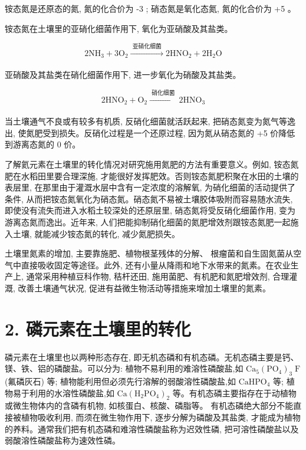 \documentclass[10pt]{article}
\begin{document}
铵态氮是还原态的氮, 氮的化合价为 -3 ; 硝态氮是氧化态氮, 氮的化合价为 +5 。

铵态氮在土壤里的亚硝化细菌作用下, 氧化为亚硝酸及其盐类。

\[
2{\mathrm{{NH}}}_{3} + 3{\mathrm{O}}_{2}\xrightarrow[]{\text{ 亚硝化细菌 }}2{\mathrm{{HNO}}}_{2} + 2{\mathrm{H}}_{2}\mathrm{O}
\]

亚硝酸及其盐类在硝化细菌作用下, 进一步氧化为硝酸及其盐类。

\[
2{\mathrm{{HNO}}}_{2} + {\mathrm{O}}_{2}\xrightarrow[]{\text{ 硝化细菌 }}2{\mathrm{{HNO}}}_{3}
\]

当土壤通气不良或有较多有机质, 反硝化细菌就活跃起来, 把硝态氮变为氮气等逸出, 使氮肥受到损失。反硝化过程是一个还原过程, 因为氮从硝态氮的 +5 价降低到游离态氮的 0 价。

了解氦元素在土壤里的转化情况对研究施用氮肥的方法有重要意义。例如, 铵态氮肥在水稻田里要合理深施, 才能很好发挥肥效。否则铵态氮肥积聚在水田的土壤的表层里, 在那里由于灌溉水层中含有一定浓度的溶解氧, 为硝化细菌的活动提供了条件, 从而把铵态氮氧化为硝态氮。硝态氮不易被土壤胶体吸附而容易随水流失, 即使没有流失而进入水稻土较深处的还原层里, 硝态氮将受反硝化细菌作用, 变为游离态氮而逸出。近年来, 人们把能抑制硝化细菌的氮肥增效剂跟铵态氮肥一起施入土壤, 就能减少铵态氮的转化, 减少氮肥损失。

土壤里氮素的增加, 主要靠施肥、植物根茎残体的分解、 根瘤菌和自生固氮菌从空气中直接吸收固定等途径。此外, 还有小量从降雨和地下水带来的氮素。在农业生产上, 通常采用种植豆科作物, 秸杆还田, 施用菌肥、有机肥和氮肥增效剂, 合理灌溉, 改善土壤通气状况, 促进有益微生物活动等措施来增加土壤里的氮素。

\section*{2. 磷元素在土壤里的转化}

磷元素在土壤里也以两种形态存在, 即无机态磷和有机态磷。无机态磷主要是钙、镁、铁、铝的磷酸盐。可以分为: 植物不易利用的难溶性磷酸盐,如 \({\mathrm{{Ca}}}_{5}{\left( {\mathrm{{PO}}}_{4}\right) }_{3}\mathrm{\;F}\) (氟磷灰石) 等; 植物能利用但必须先行溶解的弱酸溶性磷酸盐,如 \({\mathrm{{CaHPO}}}_{4}\) 等; 植物易于利用的水溶性磷酸盐,如 \(\mathrm{{Ca}}{\left( {\mathrm{H}}_{2}{\mathrm{{PO}}}_{4}\right) }_{2}\) 等。有机态磷主要指存在于动植物或微生物体内的含磷有机物, 如核蛋白、核酸、磷脂等。 有机态磷绝大部分不能直接被植物吸收利用, 而须在微生物作用下, 逐步分解为磷酸及其盐类, 才能成为植物的养料。通常我们把有机态磷和难溶性磷酸盐称为迟效性磷, 把可溶性磷酸盐以及弱酸溶性磷酸盐称为速效性磷。
\end{document}
